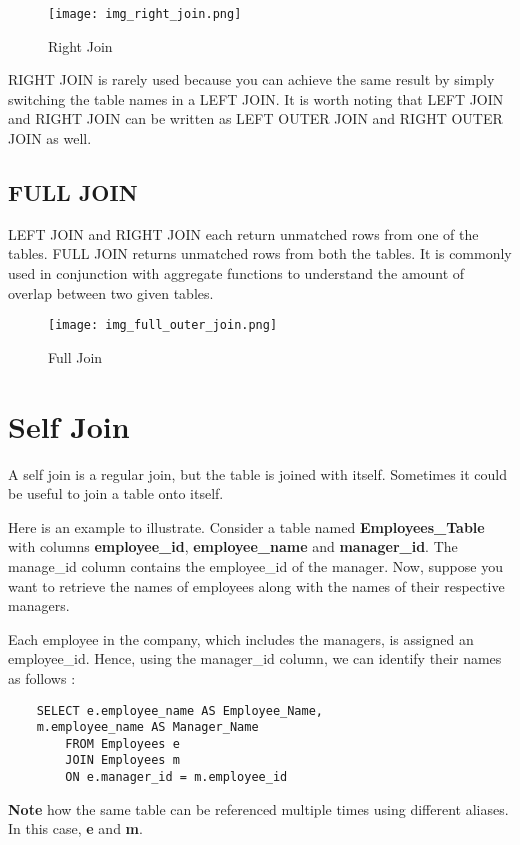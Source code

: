 \documentclass[12pt, letterpaper]{article}
\begin{document}
\begin{figure}[H]
    \centering
    \texttt{[image: img\_right\_join.png]}
    \caption{Right Join}
    \label{rightjoin}
\end{figure}

RIGHT JOIN is rarely used because you can achieve the same result by simply switching the table names in a LEFT JOIN. It is worth noting that LEFT JOIN and RIGHT JOIN can be written as LEFT OUTER JOIN and RIGHT OUTER JOIN as well.

\subsection{FULL JOIN}
LEFT JOIN and RIGHT JOIN each return unmatched rows from one of the tables. FULL JOIN returns unmatched rows from both the tables. It is commonly used in conjunction with aggregate functions to understand the amount of overlap between two given tables.

\begin{figure}[H]
    \centering
    \texttt{[image: img\_full\_outer\_join.png]}
    \caption{Full Join}
    \label{fulljoin}
\end{figure}


\section{Self Join}
A self join is a regular join, but the table is joined with itself. Sometimes it could be useful to join a table onto itself.

Here is an example to illustrate. Consider a table named \textbf{Employees\_Table} with columns \textbf{employee\_id}, \textbf{employee\_name} and \textbf{manager\_id}. The manage\_id column contains the employee\_id of the manager. Now, suppose you want to retrieve the names of employees along with the names of their respective managers.

Each employee in the company, which includes the managers, is assigned an employee\_id. Hence, using the manager\_id column, we can identify their names as follows : 

\begin{verbatim}
    SELECT e.employee_name AS Employee_Name, 
    m.employee_name AS Manager_Name
        FROM Employees e
        JOIN Employees m 
        ON e.manager_id = m.employee_id
\end{verbatim}

\textbf{Note} how the same table can be referenced multiple times using different aliases. In this case, \textbf{e} and \textbf{m}.
\end{document}
